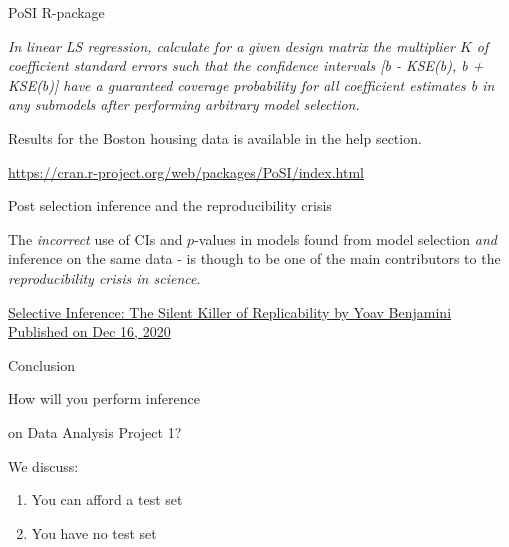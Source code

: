 \documentclass[
  ignorenonframetext,
]{beamer}
\providecommand{\tightlist}{%
  \setlength{\itemsep}{0pt}\setlength{\parskip}{0pt}}
\begin{document}
\begin{frame}

\begin{block}{PoSI R-package}

\emph{In linear LS regression, calculate for a given design matrix the
multiplier \(K\) of coefficient standard errors such that the confidence
intervals {[}b - K\emph{SE(b), b + K}SE(b){]} have a guaranteed coverage
probability for all coefficient estimates b in any submodels after
performing arbitrary model selection.}

Results for the Boston housing data is available in the help section.

\url{https://cran.r-project.org/web/packages/PoSI/index.html}

\end{block}

\end{frame}

\begin{frame}

\begin{block}{Post selection inference and the reproducibility crisis}

The \emph{incorrect} use of CIs and \(p\)-values in models found from
model selection \emph{and} inference on the same data - is though to be
one of the main contributors to the \emph{reproducibility crisis in
science}.

\href{https://hdsr.mitpress.mit.edu/pub/l39rpgyc/release/1}{Selective
Inference: The Silent Killer of Replicability by Yoav Benjamini
Published on Dec 16, 2020}

\end{block}

\end{frame}

\begin{frame}{Conclusion}
\protect\hypertarget{conclusion-1}{}

\begin{block}{How will you perform inference}

on Data Analysis Project 1?

We discuss:

\begin{enumerate}
[1)]
\tightlist
\item
  You can afford a test set
\item
  You have no test set
\end{enumerate}

\end{block}

\end{frame}
\end{document}
